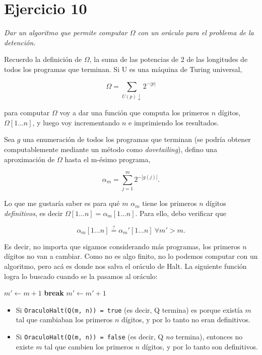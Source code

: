 \documentclass{article}
\theoremstyle{definition} %
\newcommand{\progends}{\downarrow}
\newcommand{\firstn}[1]{\first{n}{#1}}
\newcommand{\first}[2]{#2[1 \dots #1]}
\begin{document}
\newpage 

\section*{Ejercicio 10}

\textit{Dar un algoritmo que permite computar $\Omega$ con un oráculo para el problema de la detención.}

Recuerdo la definición de $\Omega$, la suma de las potencias de 2 de las
longitudes de todos los programas que terminan. Si U es una máquina de Turing
universal,

\[
    \Omega = \sum_{U(p)\progends} 2 ^ {-|p|}
\]

para computar $\Omega$ voy a dar una función que computa los primeros $n$
dígitos, $\firstn{\Omega}$, y luego voy incrementando $n$ e imprimiendo los
resultados.

Sea $g$ una enumeración de todos los programas que terminan (se
podría obtener computablemente mediante un método como \textit{dovetailing}),
defino una aproximación de $\Omega$ hasta el m-ésimo programa,

\[
    \alpha_m = \sum_{j = 1}^{m} 2 ^ {-|g(j)|}.
\]

Lo que me gustaría saber es para qué $m$ $\alpha_m$ tiene los primeros $n$
dígitos \textit{definitivos}, es decir $\firstn{\Omega} = \firstn{\alpha_m}$.
Para ello, debo verificar que

\[
    \firstn{\alpha_m} \overset{?}{=} \firstn{\alpha_m'}\ \forall m' > m.
\]

Es decir, no importa que sigamos considerando más programas, los primeros $n$
dígitos no van a cambiar. Como no es algo finito, no lo podemos computar con un
algoritmo, pero acá es donde nos salva el oráculo de Halt. La siguiente función
logra lo buscado cuando se la pasamos al oráculo:

\vspace{0.5cm}

\begin{algorithmic}
        \State $m' \gets m + 1$
            \If{$\firstn{\alpha_m} \neq \firstn{\alpha_m'}$}
            \State \textbf{break}
            \EndIf
            \State $m' \gets m' + 1$
        \EndWhile
    \EndFunction
\end{algorithmic}

\begin{itemize}
    \item Si \texttt{OraculoHalt(Q(m, n)) = true} (es decir, Q termina) es
    porque existía $m$ tal que cambiaban los primeros $n$ dígitos, y por lo
    tanto no eran definitivos.

    \item Si \texttt{OraculoHalt(Q(m, n)) = false} (es decir, Q \textit{no}
    termina), entonces no existe $m$ tal que cambien los primeros $n$ dígitos, y
    por lo tanto son definitivos.
\end{itemize}
\end{document}
